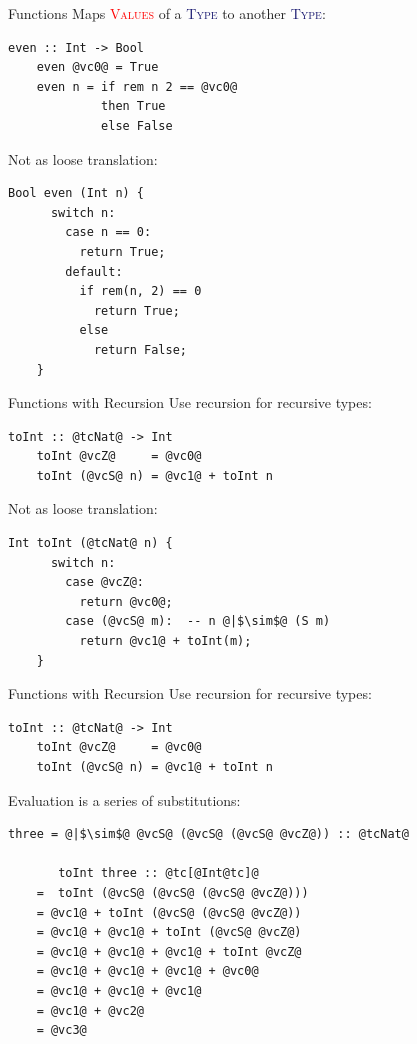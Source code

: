 \documentclass[xcolor={usenames,dvipsnames}]{beamer}
\newcommand{\htycon}[1]{\textcolor{MidnightBlue}{\textsc{#1}}}
\newcommand{\hvalcon}[1]{\textcolor{Red}{\textsc{#1}}}
\begin{document}
\begin{frame}[fragile]{Functions}
  Maps \hvalcon{Values} of a \htycon{Type} to another \htycon{Type}:
  \begin{lstlisting}[style=hask]
    even :: Int -> Bool
    even @vc0@ = True
    even n = if rem n 2 == @vc0@
             then True
             else False
  \end{lstlisting}

  \pause
  Not as loose translation:
  \begin{lstlisting}[style=hask]
    Bool even (Int n) {
      switch n:
        case n == 0:
          return True;
        default:
          if rem(n, 2) == 0
            return True;
          else
            return False;
    }
  \end{lstlisting}
\end{frame}

\begin{frame}[fragile]{Functions with Recursion}
  Use recursion for recursive types:
  \begin{lstlisting}[style=hask]
    toInt :: @tcNat@ -> Int
    toInt @vcZ@     = @vc0@
    toInt (@vcS@ n) = @vc1@ + toInt n
  \end{lstlisting}

  \pause
  Not as loose translation:
  \begin{lstlisting}[style=hask]
    Int toInt (@tcNat@ n) {
      switch n:
        case @vcZ@:
          return @vc0@;
        case (@vcS@ m):  -- n @|$\sim$@ (S m)
          return @vc1@ + toInt(m);
    }
  \end{lstlisting}
\end{frame}

\begin{frame}[fragile]{Functions with Recursion}
  Use recursion for recursive types:
  \begin{lstlisting}[style=hask]
    toInt :: @tcNat@ -> Int
    toInt @vcZ@     = @vc0@
    toInt (@vcS@ n) = @vc1@ + toInt n
  \end{lstlisting}

  Evaluation is a series of substitutions:
  \begin{lstlisting}[style=hask]
    three = @|$\sim$@ @vcS@ (@vcS@ (@vcS@ @vcZ@)) :: @tcNat@

       toInt three :: @tc[@Int@tc]@
    =  toInt (@vcS@ (@vcS@ (@vcS@ @vcZ@)))
    = @vc1@ + toInt (@vcS@ (@vcS@ @vcZ@))
    = @vc1@ + @vc1@ + toInt (@vcS@ @vcZ@)
    = @vc1@ + @vc1@ + @vc1@ + toInt @vcZ@
    = @vc1@ + @vc1@ + @vc1@ + @vc0@
    = @vc1@ + @vc1@ + @vc1@
    = @vc1@ + @vc2@
    = @vc3@
  \end{lstlisting}
\end{frame}
\end{document}
